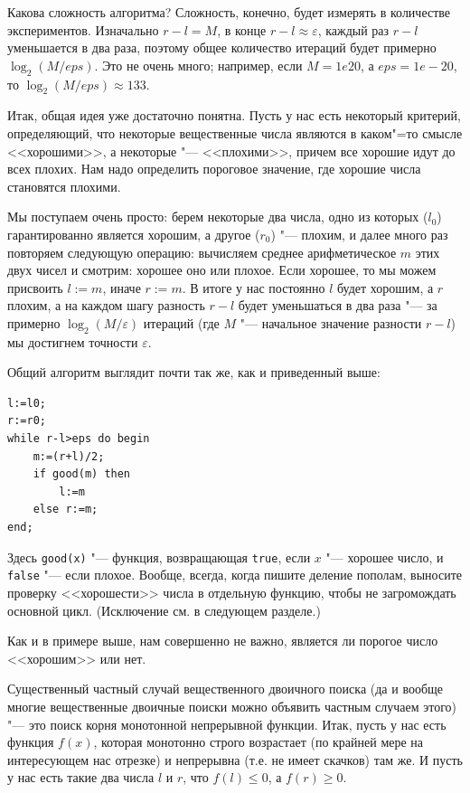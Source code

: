 \documentclass[a4paper,10pt]{problems}
\let\eps\varepsilon
\begin{document}
Какова сложность алгоритма? Сложность, конечно, будет измерять в количестве экспериментов.
Изначально $r-l=M$, в конце $r-l\approx \eps$, каждый раз $r-l$ уменьшается в два раза,
поэтому общее количество итераций будет примерно $\log_2 (M/eps)$. 
Это не очень много; например, если $M=1e20$, а $eps=1e-20$, то $\log_2 (M/eps)\approx 133$.

Итак, общая идея уже достаточно понятна. 
Пусть у нас есть некоторый критерий, определяющий, что некоторые вещественные числа являются в каком"=то смысле <<хорошими>>, а некоторые "--- <<плохими>>,
причем все хорошие идут до всех плохих. 
Нам надо определить пороговое значение, где хорошие числа становятся плохими.

Мы поступаем очень просто: берем некоторые два числа, одно из которых ($l_0$) гарантированно является хорошим, а другое ($r_0$) "--- плохим,
и далее много раз повторяем следующую операцию: вычисляем среднее арифметическое $m$ этих двух чисел и смотрим: хорошее оно или плохое.
Если хорошее, то мы можем присвоить $l:=m$, иначе $r:=m$. 
В итоге у нас постоянно $l$ будет хорошим, а $r$ плохим, а на каждом шагу разность $r-l$ будет уменьшаться в два раза 
"--- за примерно $\log_2(M/\eps)$ итераций (где $M$ "--- начальное значение разности $r-l$) мы достигнем точности $\eps$.

Общий алгоритм выглядит почти так же, как и приведенный выше:
\begin{codesampleo}\begin{verbatim}
l:=l0;
r:=r0;
while r-l>eps do begin    
    m:=(r+l)/2;
    if good(m) then
        l:=m
    else r:=m;
end;
\end{verbatim}
\end{codesampleo}

Здесь \verb`good(x)` "--- функция, возвращающая \verb`true`, если $x$ "--- хорошее число, и \verb`false` "--- если плохое. 
Вообще, всегда, когда пишите деление пополам, выносите проверку <<хорошести>> числа в отдельную функцию, чтобы не загромождать основной цикл.
(Исключение см. в следующем разделе.)

Как и в примере выше, нам совершенно не важно, является ли порогое число <<хорошим>> или нет.

Существенный частный случай вещественного двоичного поиска (да и вообще многие вещественные двоичные поиски можно объявить частным случаем этого)
"--- это поиск корня монотонной непрерывной функции.
Итак, пусть у нас есть функция $f(x)$, которая монотонно строго возрастает (по крайней мере на интересующем нас отрезке) 
и непрерывна (т.е. не имеет скачков) там же.
И пусть у нас есть такие два числа $l$ и $r$, что $f(l)\leq0$, а $f(r)\geq0$.
\end{document}
